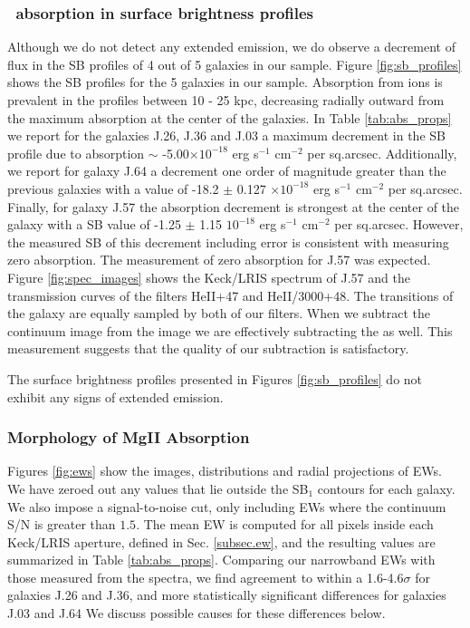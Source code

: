 \documentclass[twocolumn]{aastex61}
\begin{document}
\subsubsection{\ absorption in surface brightness profiles} \label{subsubsec:SBprofiles}
Although we do not detect any extended  emission, we do observe a decrement of flux in the SB profiles of 4 out of 5 galaxies in our sample. Figure \ref{fig:sb_profiles} shows the SB profiles for the 5 galaxies in our sample. Absorption from  ions is prevalent in the profiles between 10 - 25 kpc, decreasing radially outward from the maximum absorption at the center of the galaxies. In Table \ref{tab:abs_props} we report for the galaxies J.26, J.36 and J.03 a maximum decrement in the SB profile due to absorption $\sim$ -5.00$\times10^{-18}$ erg s$^{-1}$ cm$^{-2}$ per sq.arcsec. Additionally, we report for galaxy J.64 a decrement one order of magnitude greater than the previous galaxies with a value of -18.2 $\pm$ 0.127 $\times10^{-18}$ erg s$^{-1}$ cm$^{-2}$ per sq.arcsec. Finally, for galaxy J.57 the absorption decrement is strongest at the center of the galaxy with a SB value of -1.25 $\pm$ 1.15 $10^{-18}$ erg s$^{-1}$ cm$^{-2}$ per sq.arcsec. However, the measured SB of this decrement including error is consistent with measuring zero absorption. The measurement of zero absorption for J.57 was expected. Figure \ref{fig:spec_images} shows the Keck/LRIS spectrum of J.57 and the transmission curves of the filters HeII+47 and HeII/3000+48. The  transitions of the galaxy are equally sampled by both of our filters. When we subtract the continuum image from the  image we are effectively subtracting the  as well. This measurement suggests that the quality of our subtraction is satisfactory.  


The surface brightness profiles presented in Figures \ref{fig:sb_profiles} do not exhibit any signs of extended  emission.

\subsubsection{Morphology of MgII Absorption}
Figures \ref{fig:ews}  show the images, distributions and radial projections of  EWs. We have zeroed out any values that lie outside the SB$_1$ contours for each galaxy. We also impose a signal-to-noise cut, only including EWs where the continuum S/N is greater than $1.5$. The mean EW is computed for all pixels inside each Keck/LRIS aperture, defined in Sec. \ref{subsec.ew}, and the resulting values are summarized in Table \ref{tab:abs_props}. Comparing our narrowband EWs with those measured from the spectra, we find agreement to within a 1.6-4.6$\sigma$ for galaxies J.26 and J.36, and more statistically significant differences for galaxies J.03 and J.64 We discuss possible causes for these differences below.
\end{document}
